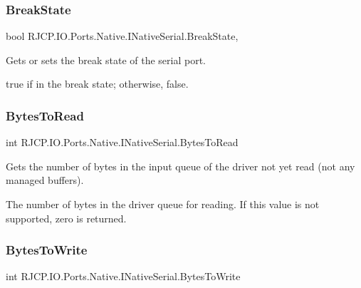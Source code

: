 \subsubsection{\texorpdfstring{BreakState}{BreakState}}
{\footnotesize\ttfamily bool R\+J\+C\+P.\+I\+O.\+Ports.\+Native.\+I\+Native\+Serial.\+Break\+State\hspace{0.3cm}{\ttfamily [get]}, {\ttfamily [set]}}



Gets or sets the break state of the serial port. 

{\ttfamily true} if in the break state; otherwise, {\ttfamily false}. \mbox{\label{interface_r_j_c_p_1_1_i_o_1_1_ports_1_1_native_1_1_i_native_serial_ac6a2545d83b684b4de2d4613611cbb99}} 
\subsubsection{\texorpdfstring{BytesToRead}{BytesToRead}}
{\footnotesize\ttfamily int R\+J\+C\+P.\+I\+O.\+Ports.\+Native.\+I\+Native\+Serial.\+Bytes\+To\+Read\hspace{0.3cm}{\ttfamily [get]}}



Gets the number of bytes in the input queue of the driver not yet read (not any managed buffers). 

The number of bytes in the driver queue for reading. If this value is not supported, zero is returned. \mbox{\label{interface_r_j_c_p_1_1_i_o_1_1_ports_1_1_native_1_1_i_native_serial_a7a110be73c7dd3a8d4a28e043d27dea5}} 
\subsubsection{\texorpdfstring{BytesToWrite}{BytesToWrite}}
{\footnotesize\ttfamily int R\+J\+C\+P.\+I\+O.\+Ports.\+Native.\+I\+Native\+Serial.\+Bytes\+To\+Write\hspace{0.3cm}{\ttfamily [get]}}



